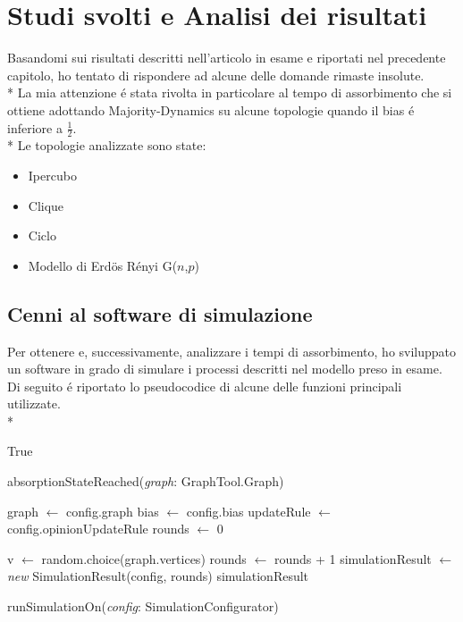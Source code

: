 \documentclass[../Tesi.tex]{subfiles}
\begin{document}
\chapter{Studi svolti e Analisi dei risultati}
Basandomi sui risultati descritti nell'articolo in esame \cite{DBLP:journals/corr/abs-2008-13589} e riportati nel precedente capitolo, ho tentato di rispondere ad alcune delle domande rimaste insolute.\\*
La mia attenzione \'e stata rivolta in particolare al tempo di assorbimento che si ottiene adottando Majority-Dynamics su alcune topologie quando il bias \'e inferiore a $\frac{1}{2}$.\\*
Le topologie analizzate sono state:
\begin{itemize}
\item Ipercubo
\item Clique
\item Ciclo
\item Modello di Erd{\"o}s R\'enyi G($n$,$p$) \cite{Erdos:1959:pmd}
\end{itemize}

\section{Cenni al software di simulazione}
Per ottenere e, successivamente, analizzare i tempi di assorbimento, ho sviluppato un software in grado di simulare i processi descritti nel modello preso in esame.
Di seguito \'e riportato lo pseudocodice di alcune delle funzioni principali utilizzate.\\*

\begin{algorithm}[H]
  \Return True\;
\caption{absorptionStateReached(\emph{graph}: GraphTool.Graph)}
\end{algorithm}
 
 \hfill \break
 
\begin{algorithm}[H]
  graph $\gets$ config.graph\;
  bias $\gets$ config.bias\;
  updateRule $\gets$ config.opinionUpdateRule\;
  rounds $\gets$ 0\;

  {
    v $\gets$ random.choice(graph.vertices)\;
    rounds $\gets$ rounds + 1\;
  }
  simulationResult $\gets$ \emph{new} SimulationResult(config, rounds)\;
  \Return simulationResult\;
\caption{runSimulationOn(\emph{config}: SimulationConfigurator)}
\end{algorithm}
 
\end{document}
